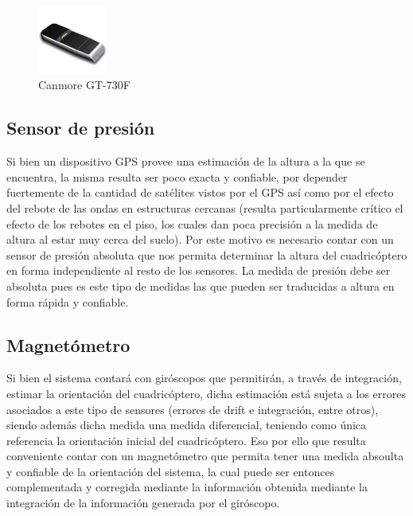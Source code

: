 \documentclass[main]{subfiles}
\begin{document}
\begin{figure}[h!]
	\centering
	\includegraphics[width=0.2\textwidth]{./pics_eleccion_hardware/gps.jpg}
	\caption{Canmore GT-730F}
	\label{fig:gps}
\end{figure}

\subsection{Sensor de presi\'on}
\vspace*{15pt}
Si bien un dispositivo GPS provee una estimaci\'on de la altura a la que se encuentra, la misma resulta ser poco exacta y confiable, por depender fuertemente de la cantidad de sat\'elites vistos por el GPS as\'i como por el efecto del rebote de las ondas en estructuras cercanas (resulta particularmente cr\'itico el efecto de los rebotes en el piso, los cuales dan poca precisi\'on a la medida de altura al estar muy cerca del suelo). Por este motivo es necesario contar con un sensor de presi\'on absoluta que nos permita determinar la altura del cuadric\'optero en forma independiente al resto de los sensores. La medida de presi\'on debe ser absoluta pues es este tipo de medidas las que pueden ser traducidas a altura en forma r\'apida y confiable.

\subsection{Magnet\'ometro}
\vspace*{15pt}
Si bien el sistema contar\'a con gir\'oscopos que permitir\'an, a trav\'es de integraci\'on, estimar la orientaci\'on del cuadric\'optero, dicha estimaci\'on est\'a sujeta a los errores asociados a este tipo de sensores (errores de drift e integraci\'on, entre otros), siendo adem\'as dicha medida una medida diferencial, teniendo como \'unica referencia la orientaci\'on inicial del cuadric\'optero. Eso por ello que resulta conveniente contar con un magnet\'ometro que permita tener una medida absoulta y confiable de la orientaci\'on del sistema, la cual puede ser entonces complementada y corregida mediante la informaci\'on obtenida mediante la integraci\'on de la informaci\'on generada por el gir\'oscopo.
\end{document}
